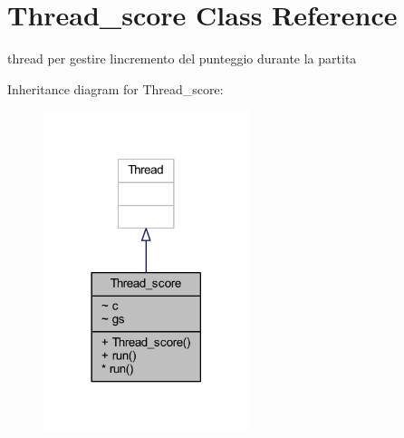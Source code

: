 \hypertarget{classcargame_1_1_thread__score}{}\section{Thread\+\_\+score Class Reference}
\label{classcargame_1_1_thread__score}


thread per gestire l\textquotesingle{}incremento del punteggio durante la partita  




Inheritance diagram for Thread\+\_\+score\+:
\nopagebreak
\begin{figure}[H]
\begin{center}
\leavevmode
\includegraphics[width=170pt]{classcargame_1_1_thread__score__inherit__graph}
\end{center}
\end{figure}


